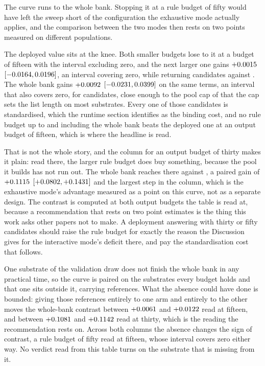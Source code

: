 \documentclass[journal=jcisd8,manuscript=suppinfo,layout=onecolumn]{achemso}
\begin{document}


The curve runs to the whole bank. Stopping it at a rule budget of fifty would have left the
sweep short of the configuration the exhaustive mode actually applies, and the comparison between
the two modes then rests on two points measured on different populations.

The deployed value sits at the knee. Both smaller budgets lose to it at a budget of fifteen with
the interval excluding zero, and the next larger one gains $+0.0015$
$[-0.0164, 0.0196]$, an interval covering zero, while returning
\numBudgetKFiveZeroCandidates{} candidates against \numBudgetKThreeZeroCandidates{}. The whole
bank gains $+0.0092$ $[-0.0231,
0.0399]$ on the same terms, an interval that also covers zero, for
\numBudgetKSevenFiveEightOneCandidates{} candidates, close enough to the pool cap of
\numHNineCap{} that the cap sets the list length on most substrates. Every one of those
candidates is standardised, which the runtime section identifies as the binding cost, and no rule
budget up to and including the whole bank beats the deployed one at an output budget of fifteen,
which is where the headline is read.

That is not the whole story, and the column for an output budget of thirty makes it plain: read
there, the larger rule budget does buy something, because the pool it builds has not run out. The
whole bank reaches \numBudgetKSevenFiveEightOneRecallthirty{} there against
\numBudgetKThreeZeroRecallthirty{}, a paired gain of $+0.1115$
$[+0.0802, +0.1431]$ and the largest
step in the column, which is the exhaustive mode's advantage measured as a point on this curve,
not as a separate design. The contrast is computed at both output budgets the table is
read at, because a recommendation that rests on two point estimates is the thing this work asks
other papers not to make. A deployment
answering with thirty or fifty candidates should raise the rule budget for exactly the reason the
Discussion gives for the interactive mode's deficit there, and pay the standardisation cost that
follows.

One substrate of the validation draw does not finish the whole bank in any practical time,
so the curve is paired on the \numBudgetSubstrates{} substrates every budget holds and that one
sits outside it, carrying \numBudgetExcludedrefsWord{} references. What the absence could have
done is bounded: giving those references entirely to one arm and entirely to
the other moves the whole-bank contrast between $+0.0061$ and
$+0.0122$ read at fifteen, and between
$+0.1081$ and $+0.1142$
read at thirty, which is the reading the recommendation rests on. Across both columns the absence
changes the sign of \numBudgetFragileWord{} contrast, a rule budget of fifty read at fifteen,
whose interval covers zero either way. No verdict read from this table turns on the substrate
that is missing from it.
\end{document}
